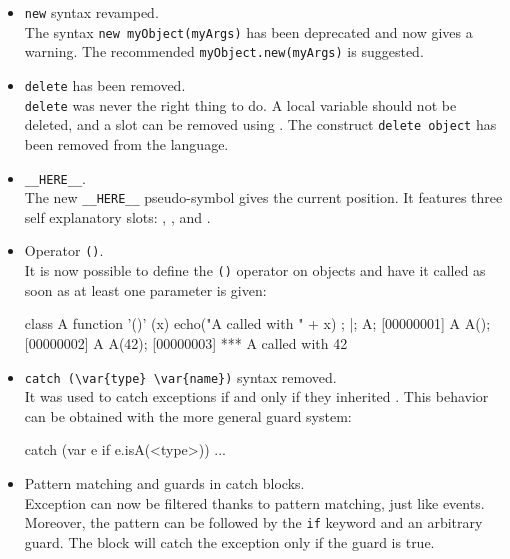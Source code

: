 \begin{itemize}
\item \lstinline|new| syntax revamped.\\
  The syntax \lstinline{new myObject(myArgs)} has been deprecated and now
  gives a warning. The recommended \lstinline{myObject.new(myArgs)} is
  suggested.

\item \lstinline|delete| has been removed.\\
  \lstinline|delete| was never the right thing to do. A local variable
  should not be deleted, and a slot can be removed using
  .  The construct \lstinline{delete object} has
  been removed from the language.

\item \lstinline|__HERE__|.\\
  The new \lstinline|__HERE__| pseudo-symbol gives the current position.  It
  features three self explanatory slots: , , and
  .

\item Operator \lstinline|()|.\\
  It is now possible to define the \lstinline|()| operator on objects and
  have it called as soon as at least one parameter is given:

\begin{urbiscript}
class A {
  function '()' (x) { echo("A called with " + x) };
}|;
A;
[00000001] A
A();
[00000002] A
A(42);
[00000003] *** A called with 42
\end{urbiscript}

\item \lstinline|catch (\var{type} \var{name})| syntax removed.\\
  It was used to catch exceptions if and only if they inherited
  . This behavior can be obtained with the more general guard
  system:

\begin{urbiunchecked}
catch (var e if e.isA(<type>))
{
  ...
}
\end{urbiunchecked}

\item Pattern matching and guards in catch blocks.\\
  Exception can now be filtered thanks to pattern matching, just like
  events. Moreover, the pattern can be followed by the \lstinline{if}
  keyword and an arbitrary guard. The block will catch the exception only if
  the guard is true.


\end{itemize}

